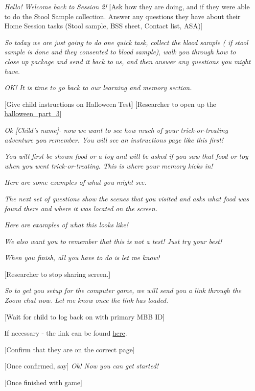 \documentclass[
]{book}
\begin{document}
\emph{Hello! Welcome back to Session 2!} {[}Ask how they are doing, and if they were able to do the Stool Sample collection. Answer any questions they have about their Home Session tasks (Stool sample, BSS sheet, Contact list, ASA){]}

\emph{So today we are just going to do one quick task, collect the blood sample ( if stool sample is done and they consented to blood sample), walk you through how to close up package and send it back to us, and then answer any questions you might have.}

\emph{OK! It is time to go back to our learning and memory section.}

{[}Give child instructions on Halloween Test{]} {[}Researcher to open up the \href{https://app.box.com/file/784713950398}{halloween\_part\_3}{]}

\emph{Ok {[}Child's name{]}- now we want to see how much of your trick-or-treating adventure you remember. You will see an instructions page like this first!}

\emph{You will first be shown food or a toy and will be asked if you saw that food or toy when you went trick-or-treating. This is where your memory kicks in!}

\emph{Here are some examples of what you might see.}

\emph{The next set of questions show the scenes that you visited and asks what food was found there and where it was located on the screen.}

\emph{Here are examples of what this looks like!}

\emph{We also want you to remember that this is not a test! Just try your best!}

\emph{When you finish, all you have to do is let me know!}

{[}Researcher to stop sharing screen.{]}

\emph{So to get you setup for the computer game, we will send you a link through the Zoom chat now. Let me know once the link has loaded.}

{[}Wait for child to log back on with primary MBB ID{]}

If necessary - the link can be found \href{https://research.sc/participant/login/20451/publicid}{here}.

{[}Confirm that they are on the correct page{]}

{[}Once confirmed, say{]} \emph{Ok! Now you can get started!}

{[}Once finished with game{]}
\end{document}
